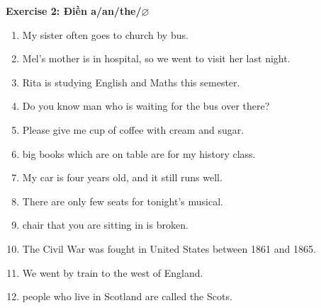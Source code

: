 \documentclass[12pt,a4paper,twoside]{article}
\begin{document}
\begin{groupbox}\textbf{\large Exercise 2: Điền a/an/the/\(\varnothing\)}\end{groupbox}
\begin{enumerate}[label=\textbf{\arabic*.}, leftmargin=2em, itemsep=6pt, topsep=4pt]
\item My sister often goes to \underline{\hspace{1.3cm}} church by \underline{\hspace{1.3cm}} bus.
\item Mel's mother is in \underline{\hspace{1.3cm}} hospital, so we went to visit her last night.
\item Rita is studying \underline{\hspace{1.3cm}} English and \underline{\hspace{1.3cm}} Maths this semester.
\item Do you know \underline{\hspace{1.3cm}} man who is waiting for the bus over there?
\item Please give me \underline{\hspace{1.3cm}} cup of \underline{\hspace{1.3cm}} coffee with \underline{\hspace{1.3cm}} cream and \underline{\hspace{1.3cm}} sugar.
\item \underline{\hspace{1.3cm}} big books which are on \underline{\hspace{1.3cm}} table are for my history class.
\item My \underline{\hspace{1.3cm}} car is four years old, and it still runs well.
\item There are only \underline{\hspace{1.3cm}} few seats for tonight's musical.
\item \underline{\hspace{1.3cm}} chair that you are sitting in is broken.
\item The Civil War was fought in \underline{\hspace{1.3cm}} United States between 1861 and 1865.
\item We went by \underline{\hspace{1.3cm}} train to the west of England.
\item \underline{\hspace{1.3cm}} people who live in \underline{\hspace{1.3cm}} Scotland are called the Scots.

\end{enumerate}
\end{document}
